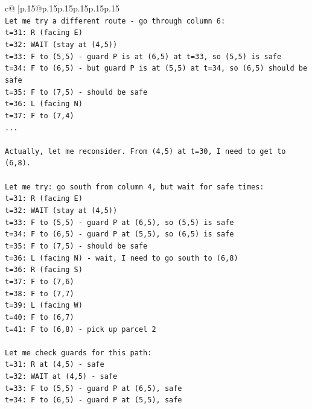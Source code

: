\documentclass{article}
\begin{document}
{\begin{supertabular}{c@{$\;$}|p{.15\linewidth}@{}p{.15\linewidth}p{.15\linewidth}p{.15\linewidth}p{.15\linewidth}p{.15\linewidth}}
{{{\\ 
\texttt{Let me try a different route {-} go through column 6:} \\
\texttt{t=31: R (facing E)} \\
\texttt{t=32: WAIT (stay at (4,5))} \\
\texttt{t=33: F to (5,5) {-} guard P is at (6,5) at t=33, so (5,5) is safe} \\
\texttt{t=34: F to (6,5) {-} but guard P is at (5,5) at t=34, so (6,5) should be safe} \\
\texttt{t=35: F to (7,5) {-} should be safe} \\
\texttt{t=36: L (facing N)} \\
\texttt{t=37: F to (7,4)} \\
\texttt{...} \\
\\ 
\texttt{Actually, let me reconsider. From (4,5) at t=30, I need to get to (6,8).} \\
\\ 
\texttt{Let me try: go south from column 4, but wait for safe times:} \\
\texttt{t=31: R (facing E)} \\
\texttt{t=32: WAIT (stay at (4,5))} \\
\texttt{t=33: F to (5,5) {-} guard P at (6,5), so (5,5) is safe} \\
\texttt{t=34: F to (6,5) {-} guard P at (5,5), so (6,5) is safe} \\
\texttt{t=35: F to (7,5) {-} should be safe} \\
\texttt{t=36: L (facing N) {-} wait, I need to go south to (6,8)} \\
\texttt{t=36: R (facing S)} \\
\texttt{t=37: F to (7,6)} \\
\texttt{t=38: F to (7,7)} \\
\texttt{t=39: L (facing W)} \\
\texttt{t=40: F to (6,7)} \\
\texttt{t=41: F to (6,8) {-} pick up parcel 2} \\
\\ 
\texttt{Let me check guards for this path:} \\
\texttt{t=31: R at (4,5) {-} safe} \\
\texttt{t=32: WAIT at (4,5) {-} safe} \\
\texttt{t=33: F to (5,5) {-} guard P at (6,5), safe} \\
\texttt{t=34: F to (6,5) {-} guard P at (5,5), safe} \\
}}}
\end{supertabular}}
\end{document}
